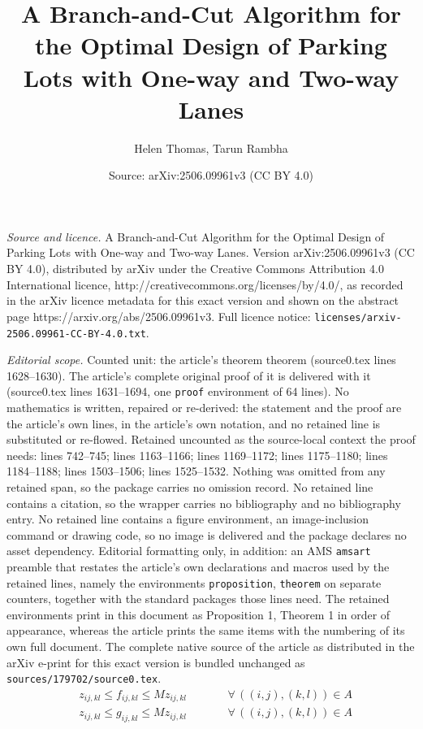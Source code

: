 \documentclass[10pt,a4paper]{amsart}
\title{A Branch-and-Cut Algorithm for the Optimal Design of Parking Lots with One-way and Two-way Lanes}
\author{Helen Thomas, Tarun Rambha}
\date{Source: arXiv:2506.09961v3 (CC BY 4.0)}
\newcommand{\countvar}[4]{z_{#1#2,#3#4}}
\newcommand{\flowvar}[4]{f_{#1#2,#3#4}}
\newcommand{\flowvardash}[4]{g_{#1#2,#3#4}}
\newcommand{\gridarcset}{A}
\begin{document}
\maketitle

\noindent\emph{Source and licence.} A Branch-and-Cut Algorithm for the Optimal Design of Parking Lots with One-way and Two-way Lanes. Version arXiv:2506.09961v3 (CC BY 4.0), distributed by arXiv under the Creative Commons Attribution 4.0 International licence, http://creativecommons.org/licenses/by/4.0/, as recorded in the arXiv licence metadata for this exact version and shown on the abstract page https://arxiv.org/abs/2506.09961v3. Full licence notice: \texttt{licenses/arxiv-2506.09961-CC-BY-4.0.txt}.\par\smallskip

\noindent\textit{Editorial scope.} Counted unit: the article's theorem theorem (source0.tex lines 1628--1630). The article's complete original proof of it is delivered with it (source0.tex lines 1631--1694, one \texttt{proof} environment of 64 lines). No mathematics is written, repaired or re-derived: the statement and the proof are the article's own lines, in the article's own notation, and no retained line is substituted or re-flowed.  Retained uncounted as the source-local context the proof needs: lines 742--745; lines 1163--1166; lines 1169--1172; lines 1175--1180; lines 1184--1188; lines 1503--1506; lines 1525--1532.  Nothing was omitted from any retained span, so the package carries no omission record.  No retained line contains a citation, so the wrapper carries no bibliography and no bibliography entry.  No retained line contains a figure environment, an image-inclusion command or drawing code, so no image is delivered and the package declares no asset dependency.  Editorial formatting only, in addition: an AMS \texttt{amsart} preamble that restates the article's own declarations and macros used by the retained lines, namely the environments \texttt{proposition}, \texttt{theorem} on separate counters, together with the standard packages those lines need.  The retained environments print in this document as Proposition 1, Theorem 1 in order of appearance, whereas the article prints the same items with the numbering of its own full document.  The complete native source of the article as distributed in the arXiv e-print for this exact version is bundled unchanged as \texttt{sources/179702/source0.tex}.
\begin{align} 
    & \countvar{i}{j}{k}{l} \leq \flowvar{i}{j}{k}{l} \leq  M \countvar{i}{j}{k}{l} \qquad && \forall \, ((i,j), (k,l)) \in \gridarcset  \label{eq:count_var_bounds}\\
    & \countvar{i}{j}{k}{l} \leq \flowvardash{i}{j}{k}{l} \leq M \countvar{i}{j}{k}{l} \qquad && \forall \, ((i,j), (k,l)) \in \gridarcset   \label{eq:count_dash_var_bounds}     
\end{align}
\end{document}
